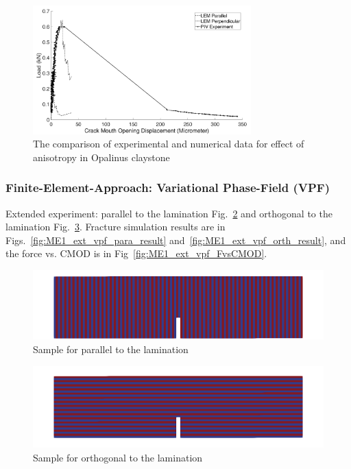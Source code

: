 \begin{figure}[!ht]
\centering
\includegraphics[width=0.75\textwidth]{figures/Amir_ME1_LEM_Claystone.png}
\caption{The comparison of experimental and numerical data for effect of anisotropy in Opalinus claystone} 
\label{fig:Amir_ME1_LEM_Claystone}
\end{figure}

\subsubsection*{Finite-Element-Approach: Variational Phase-Field (VPF)}

Extended experiment: parallel to the lamination Fig.~\ref{fig:ME1_ext_vpf_para_init} and orthogonal to the lamination Fig.~\ref{fig:ME1_ext_vpf_orth_init}.
Fracture simulation results are in Figs.~\ref{fig:ME1_ext_vpf_para_result} and~\ref{fig:ME1_ext_vpf_orth_result}, and the force vs. CMOD is in Fig~\ref{fig:ME1_ext_vpf_FvsCMOD}.

\begin{figure}[!ht]
\centering
\includegraphics[width=1\textwidth]{figures/ME1_ext_2D_parallel_init.png}
\caption{Sample for parallel to the lamination}
\label{fig:ME1_ext_vpf_para_init}
\end{figure}

\begin{figure}[!ht]
\centering
\includegraphics[width=1\textwidth]{figures/ME1_ext_2D_orthogonal_init.png}
\caption{Sample for orthogonal to the lamination}
\label{fig:ME1_ext_vpf_orth_init}
\end{figure}

